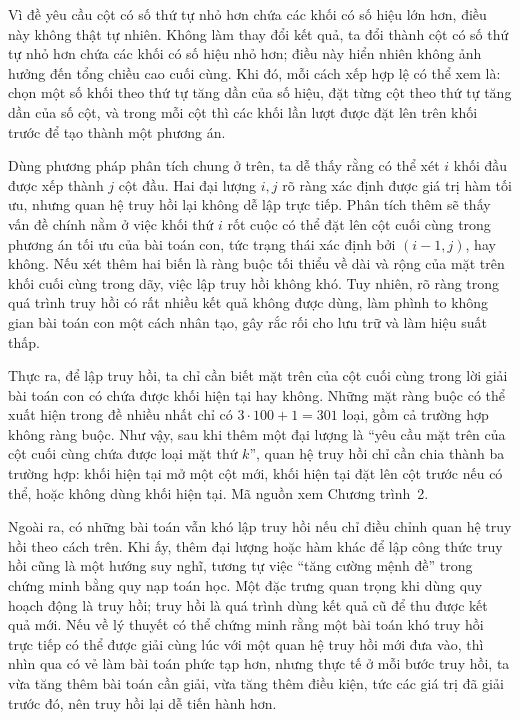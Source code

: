 \documentclass[11pt]{article}
\begin{document}
Vì đề yêu cầu cột có số thứ tự nhỏ hơn chứa các khối có số hiệu lớn hơn, điều
này không thật tự nhiên. Không làm thay đổi kết quả, ta đổi thành cột có số
thứ tự nhỏ hơn chứa các khối có số hiệu nhỏ hơn; điều này hiển nhiên không
ảnh hưởng đến tổng chiều cao cuối cùng. Khi đó, mỗi cách xếp hợp lệ có thể
xem là: chọn một số khối theo thứ tự tăng dần của số hiệu, đặt từng cột theo
thứ tự tăng dần của số cột, và trong mỗi cột thì các khối lần lượt được đặt
lên trên khối trước để tạo thành một phương án.

Dùng phương pháp phân tích chung ở trên, ta dễ thấy rằng có thể xét \(i\)
khối đầu được xếp thành \(j\) cột đầu. Hai đại lượng \(i,j\) rõ ràng xác định
được giá trị hàm tối ưu, nhưng quan hệ truy hồi lại không dễ lập trực tiếp.
Phân tích thêm sẽ thấy vấn đề chính nằm ở việc khối thứ \(i\) rốt cuộc có thể
đặt lên cột cuối cùng trong phương án tối ưu của bài toán con, tức trạng thái
xác định bởi \((i-1,j)\), hay không. Nếu xét thêm hai biến là ràng buộc tối
thiểu về dài và rộng của mặt trên khối cuối cùng trong dãy, việc lập truy hồi
không khó. Tuy nhiên, rõ ràng trong quá trình truy hồi có rất nhiều kết quả
không được dùng, làm phình to không gian bài toán con một cách nhân tạo, gây
rắc rối cho lưu trữ và làm hiệu suất thấp.

Thực ra, để lập truy hồi, ta chỉ cần biết mặt trên của cột cuối cùng trong lời
giải bài toán con có chứa được khối hiện tại hay không. Những mặt ràng buộc có
thể xuất hiện trong đề nhiều nhất chỉ có \(3\cdot100+1=301\) loại, gồm cả
trường hợp không ràng buộc. Như vậy, sau khi thêm một đại lượng là ``yêu cầu
mặt trên của cột cuối cùng chứa được loại mặt thứ \(k\)'', quan hệ truy hồi
chỉ cần chia thành ba trường hợp: khối hiện tại mở một cột mới, khối hiện tại
đặt lên cột trước nếu có thể, hoặc không dùng khối hiện tại. Mã nguồn xem
Chương trình~2.

Ngoài ra, có những bài toán vẫn khó lập truy hồi nếu chỉ điều chỉnh quan hệ
truy hồi theo cách trên. Khi ấy, thêm đại lượng hoặc hàm khác để lập công thức
truy hồi cũng là một hướng suy nghĩ, tương tự việc ``tăng cường mệnh đề''
trong chứng minh bằng quy nạp toán học. Một đặc trưng quan trọng khi dùng quy
hoạch động là truy hồi; truy hồi là quá trình dùng kết quả cũ để thu được kết
quả mới. Nếu về lý thuyết có thể chứng minh rằng một bài toán khó truy hồi
trực tiếp có thể được giải cùng lúc với một quan hệ truy hồi mới đưa vào, thì
nhìn qua có vẻ làm bài toán phức tạp hơn, nhưng thực tế ở mỗi bước truy hồi,
ta vừa tăng thêm bài toán cần giải, vừa tăng thêm điều kiện, tức các giá trị
đã giải trước đó, nên truy hồi lại dễ tiến hành hơn.
\end{document}
